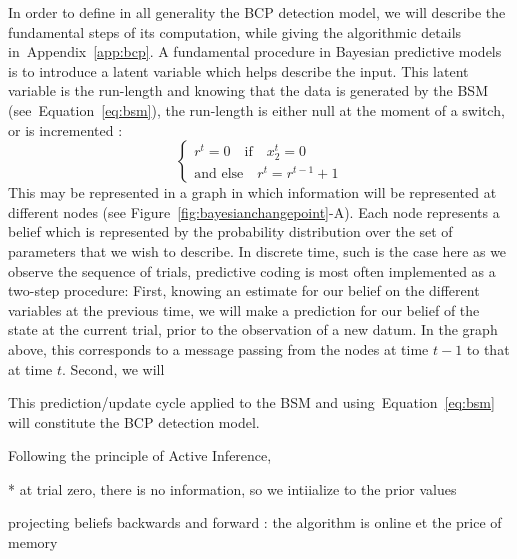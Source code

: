 \documentclass[profile,final,english,draft]{article}%
\newcommand{\choice}[1]{ %
	\left\{ %
		\begin{array}{l} #1 \end{array} %
	\right. }
\newcommand{\eql}[1]{\begin{equation}#1\end{equation}}
\newcommand{\seeFig}[1]{Figure~\ref{fig:#1}}
\newcommand{\seeEq}[1]{Equation~\ref{eq:#1}}
\newcommand{\seeApp}[1]{Appendix~\ref{app:#1}}
\begin{document}
In order to define in all generality the BCP detection model,
we will describe the fundamental steps of its computation,
while giving the algorithmic details in~\seeApp{bcp}.
A fundamental procedure in Bayesian predictive models is to introduce
a latent variable which helps describe the input.
This latent variable is the run-length and
knowing that the data is generated by the BSM (see~\seeEq{bsm}),
the run-length is either null at the moment of a switch,
or is incremented :
\eql{\choice{
r^t = 0 \quad \text{if} \quad x_2^t=0 \\
\text{and else} \quad r^t = r^{t-1} +1 }\label{eq:run_length}}
This may be represented in a graph 
in which information will be represented at different nodes (see \seeFig{bayesianchangepoint}-A). 
Each node represents a belief 
which is represented by the probability distribution 
over the set of parameters that we wish to describe.
In discrete time, such is the case here as we observe the sequence of trials,
predictive coding is most often implemented as a two-step procedure:
First, knowing an estimate for our belief on the different variables at the previous time,
we will make a prediction for our belief of the state at the current trial,
prior to the observation of a new datum.
In the graph above, this corresponds to a message passing from the nodes at time $t-1$
to that at time $t$.
Second, we will 

This prediction/update cycle applied to the BSM and using~\seeEq{bsm}
will constitute the BCP detection model.

Following the principle of Active Inference, %

* at trial zero, there is no information, so we intiialize to the prior values


projecting beliefs backwards and forward  : the algorithm is online et the price of memory

\end{document}
